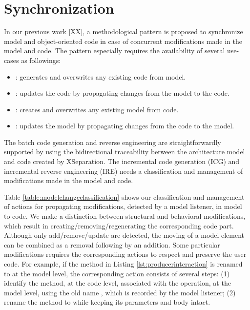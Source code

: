 \section{Synchronization}
\label{sec:collaboration}


In our previous work [XX], a methodological pattern is proposed to synchronize model and object-oriented code in case of concurrent modifications made in the model and code.
The pattern especially requires the availability of several use-cases as followings:
\begin{itemize}[\footnotesize]
	\itemsep0em
	\item {}: generates and overwrites any existing code from model.
	\item {}: updates the code by propagating changes from the model to the code.
	\item {}: creates and overwrites any existing model from code.
	\item {}: updates the model by propagating changes from the code to the model.
\end{itemize}


The batch code generation and reverse engineering are straightforwardly supported by using the bidirectional traceability between the architecture model and code created by XSeparation. The incremental code generation (ICG) and incremental reverse engineering (IRE) needs a classification and management of modifications made in the model and code.

\vskip 0.2cm
\noindent
{}
Table \ref{table:modelchangeclassification} shows our classification and management of actions for propagating modifications, detected by a model listener, in model to code.
We make a distinction between structural and behavioral modifications, which result in creating/removing/regenerating the corresponding code part.
Although only add/remove/update are detected, the moving of a model element can be combined as a removal following by an addition.  
Some particular modifications requires the corresponding actions to respect and preserve the user code.
For example, if the  method in Listing \ref{lst:producerinteraction} is renamed to  at the model level, the corresponding action consists of several steps: (1) identify the method, at the code level, associated with the operation, at the model level, using the old name , which is recorded by the model listener;
(2) rename the method to  while keeping its parameters and body intact. 

